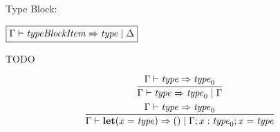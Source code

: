 Type Block:

$\fbox{$\Gamma \vdash \mathit{typeBlockItem} \Rightarrow \mathit{type} \mid \Delta$}$

TODO

\begin{gather*}
  \infer{\Gamma \vdash \mathit{type} \Rightarrow \mathit{type}_0 \mid \Gamma}{
    \Gamma \vdash \mathit{type} \Rightarrow \mathit{type}_0
  }
  \\
  \infer{\Gamma \vdash \mathbf{let}(x = \mathit{type}) \Rightarrow () \mid \Gamma; x: \mathit{type}_0; x = \mathit{type}}{
    \Gamma \vdash \mathit{type} \Rightarrow \mathit{type}_0
  }
\end{gather*}
